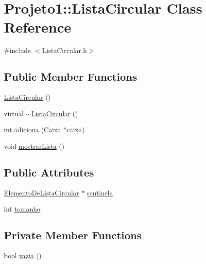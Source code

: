 \hypertarget{classProjeto1_1_1ListaCircular}{
\section{Projeto1::ListaCircular Class Reference}
\label{classProjeto1_1_1ListaCircular}
}


{\ttfamily \#include $<$ListaCircular.h$>$}

\subsection*{Public Member Functions}
\begin{DoxyCompactItemize}
\item 
\hyperlink{classProjeto1_1_1ListaCircular_ad768f1dc2214dd586457b237f646c7a8}{ListaCircular} ()
\item 
virtual \hyperlink{classProjeto1_1_1ListaCircular_afcca3f790d99dc9c747d03414612c4eb}{$\sim$ListaCircular} ()
\item 
int \hyperlink{classProjeto1_1_1ListaCircular_a35dc09255c50dd5c1fbdc80ba84b1b55}{adiciona} (\hyperlink{classProjeto1_1_1Caixa}{Caixa} $\ast$caixa)
\item 
void \hyperlink{classProjeto1_1_1ListaCircular_a17fb0d61349d4898cbdeb9e86e004759}{mostrarLista} ()
\end{DoxyCompactItemize}
\subsection*{Public Attributes}
\begin{DoxyCompactItemize}
\item 
\hyperlink{classProjeto1_1_1ElementoDeListaCircular}{ElementoDeListaCircular} $\ast$ \hyperlink{classProjeto1_1_1ListaCircular_a20d805843e5fd2b012db44ad1e705472}{sentinela}
\item 
int \hyperlink{classProjeto1_1_1ListaCircular_a56720f9fadf008f0a0ba3eac4fb6e52b}{tamanho}
\end{DoxyCompactItemize}
\subsection*{Private Member Functions}
\begin{DoxyCompactItemize}
\item 
bool \hyperlink{classProjeto1_1_1ListaCircular_a119baef55c9b1494d0307e18495270d1}{vazia} ()
\end{DoxyCompactItemize}


